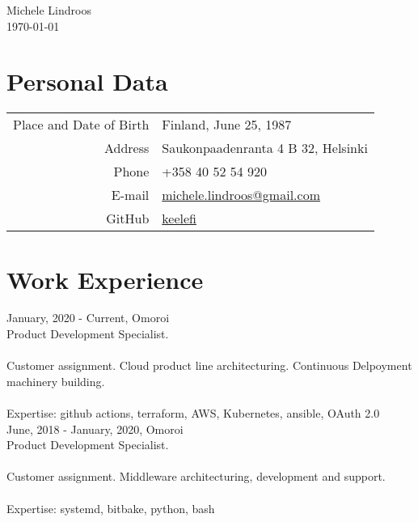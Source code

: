 \documentclass[12pt]{article}
\begin{document}

\begin{center}
\Huge{Michele Lindroos} \\
\normalsize{\today}
\end{center}


\section*{Personal Data}
\begin{tabular}{rl}
Place and Date of Birth & Finland, June 25, 1987\\
Address & Saukonpaadenranta 4 B 32, Helsinki\\
Phone & +358 40 52 54 920\\
E-mail & \href{mailto:michele.lindroos@gmail.com}{michele.lindroos@gmail.com}\\
GitHub & \href{https://github.com/keelefi}{keelefi}
\end{tabular}


\section*{Work Experience}

\large{January, 2020 - Current, Omoroi}\\
\normalsize{Product Development Specialist.}\\
\\
\normalsize{Customer assignment. Cloud product line architecturing. Continuous Delpoyment machinery building.}\\
\\
\normalsize{Expertise: github actions, terraform, AWS, Kubernetes, ansible, OAuth 2.0}\\

\large{June, 2018 - January, 2020, Omoroi}\\
\normalsize{Product Development Specialist.}\\
\\
\normalsize{Customer assignment. Middleware architecturing, development and support.}\\
\\
\normalsize{Expertise: systemd, bitbake, python, bash}\\
\end{document}
